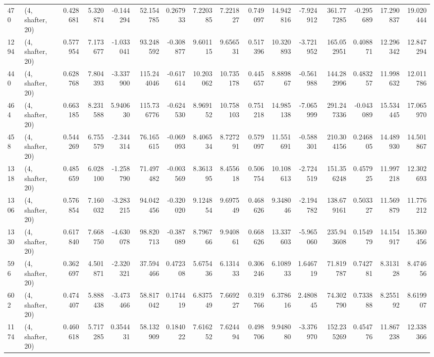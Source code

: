 \begin{tabular}{llrrrrrrrrrrrrrr}
470  &  (4, shafter, 20) &   0.428681 &   5.320874 &  -0.144294 &     52.154785 &    0.267933 &    7.220385 &    7.221827 &  0.749097 &  14.942816 &  -7.924912 &   361.777285 &  -0.295689 &  17.290837 &  19.020444 \\
1294 &  (4, shafter, 20) &   0.577954 &   7.173677 &  -1.033041 &     93.248592 &   -0.308877 &    9.601115 &    9.656531 &  0.517396 &  10.320893 &  -3.721952 &   165.052951 &   0.408871 &  12.296342 &  12.847294 \\
440  &  (4, shafter, 20) &   0.628768 &   7.804393 &  -3.337900 &    115.244046 &   -0.617614 &   10.203062 &   10.735178 &  0.445657 &   8.889867 &  -0.561988 &   144.282996 &   0.483257 &  11.998632 &  12.011786 \\
464  &  (4, shafter, 20) &   0.663185 &   8.231588 &   5.940630 &    115.736776 &   -0.624530 &    8.969152 &   10.758103 &  0.751218 &  14.985138 &  -7.065999 &   291.247336 &  -0.043089 &  15.534445 &  17.065970 \\
458  &  (4, shafter, 20) &   0.544269 &   6.755579 &  -2.344314 &     76.165615 &   -0.069093 &    8.406534 &    8.727291 &  0.579097 &  11.551691 &  -0.588301 &   210.304156 &   0.246805 &  14.489930 &  14.501867 \\
1318 &  (4, shafter, 20) &   0.485659 &   6.028100 &  -1.258790 &     71.497482 &   -0.003569 &    8.361395 &    8.455618 &  0.506754 &  10.108613 &  -2.724519 &   151.356248 &   0.457925 &  11.997218 &  12.302693 \\
1306 &  (4, shafter, 20) &   0.576854 &   7.160032 &  -3.283215 &     94.042456 &   -0.320020 &    9.124854 &    9.697549 &  0.468626 &   9.348046 &  -2.194782 &   138.679161 &   0.503327 &  11.569879 &  11.776212 \\
1330 &  (4, shafter, 20) &   0.617840 &   7.668750 &  -4.630078 &     98.820713 &   -0.387089 &    8.796766 &    9.940861 &  0.668626 &  13.337603 &  -5.965060 &   235.943608 &   0.154979 &  14.154917 &  15.360456 \\
596  &  (4, shafter, 20) &   0.362697 &   4.501871 &  -2.320321 &     37.594466 &    0.472308 &    5.675436 &    6.131433 &  0.306246 &   6.108933 &   1.646719 &    71.819787 &   0.742781 &   8.313128 &   8.474656 \\
602  &  (4, shafter, 20) &   0.474407 &   5.888438 &  -3.473466 &     58.817042 &    0.174419 &    6.837549 &    7.669227 &  0.319766 &   6.378616 &   2.480845 &    74.302790 &   0.733888 &   8.255192 &   8.619907 \\
1174 &  (4, shafter, 20) &   0.460618 &   5.717285 &   0.354431 &     58.132909 &    0.184022 &    7.616252 &    7.624494 &  0.498706 &   9.948080 &  -3.376970 &   152.235269 &   0.454776 &  11.867238 &  12.338366 \\

\end{tabular}
